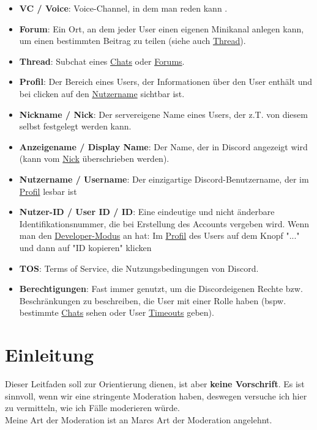 \documentclass[a4paper,12pt]{article}
\begin{document}
\begin{itemize}
    \item \textbf{VC / Voice}\hypertarget{term:vc}{}: Voice-Channel, in dem man reden kann .
    \item \textbf{Forum}\hypertarget{term:forum}{}: Ein Ort, an dem jeder User einen eigenen Minikanal anlegen kann, um einen bestimmten Beitrag zu teilen (siehe auch \hyperlink{term:thread}{Thread}).
    \item \textbf{Thread}\hypertarget{term:thread}{}: Subchat eines \hyperlink{term:chat}{Chats} oder \hyperlink{term:forum}{Forums}.
    \item \textbf{Profil}\hypertarget{term:profile}{}: Der Bereich eines Users, der Informationen über den User enthält und bei clicken auf den \hyperlink{term:username}{Nutzername} sichtbar ist.
    \item \textbf{Nickname / Nick}\hypertarget{term:nick}{}: Der servereigene Name eines Users, der z.T. von diesem selbst festgelegt werden kann.
    \item \textbf{Anzeigename / Display Name}\hypertarget{term:displayname}{}: Der Name, der in Discord angezeigt wird (kann vom \hyperlink{term:nick}{Nick} überschrieben werden).
    \item \textbf{Nutzername / Username}\hypertarget{term:username}{}: Der einzigartige Discord-Benutzername, der im \hyperlink{term:profile}{Profil} lesbar ist
    \item \textbf{Nutzer-ID / User ID / ID}\hypertarget{term:id}{}: Eine eindeutige und nicht änderbare Identifikationsnummer, die bei Erstellung des Accounts vergeben wird. Wenn man den \href{https://www.howtogeek.com/714348/how-to-enable-or-disable-developer-mode-on-discord/}{Developer-Modus} an hat: Im \hyperlink{term:profile}{Profil} des Users auf dem Knopf "..." und dann auf "ID kopieren" klicken
    \item \textbf{TOS}\hypertarget{term:tos}{}: Terms of Service, die Nutzungsbedingungen von Discord.
    \item \textbf{Berechtigungen}\hypertarget{term:berechtigungen}{}: Fast immer genutzt, um die Discordeigenen Rechte bzw. Beschränkungen zu beschreiben, die User mit einer Rolle haben (bspw. bestimmte \hyperlink{term:chat}{Chats} sehen oder User \hyperlink{term:to}{Timeouts} geben).
\end{itemize}

\section{Einleitung}
Dieser Leitfaden soll zur Orientierung dienen, ist aber \textbf{keine Vorschrift}. Es ist sinnvoll, wenn wir
eine stringente Moderation haben, deswegen versuche ich hier zu vermitteln, wie ich Fälle moderieren würde.\\
Meine Art der Moderation ist an Marcs Art der Moderation angelehnt.
\end{document}
